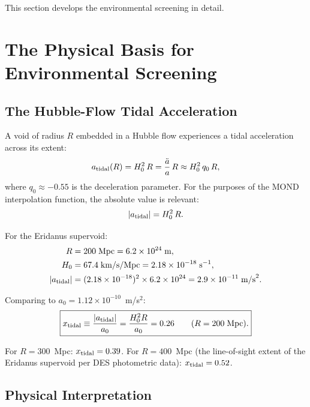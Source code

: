\documentclass[11pt,a4paper]{article}
\newcommand{\aM}{a_0}
\newcommand{\ee}[1]{\times 10^{#1}}
\begin{document}
This section develops the environmental screening in detail.


\section{The Physical Basis for Environmental Screening}
\label{sec:screening-physics}

\subsection{The Hubble-Flow Tidal Acceleration}

A void of radius $R$ embedded in a Hubble flow experiences a
tidal acceleration across its extent:
\begin{equation}
a_{\rm tidal}(R) = H_0^2\,R = \frac{\ddot{a}}{a}\,R
\approx H_0^2\,q_0\,R,
\label{eq:a-tidal}
\end{equation}
where $q_0 \approx -0.55$ is the deceleration parameter. For the
purposes of the MOND interpolation function, the absolute value
is relevant:
\begin{equation}
|a_{\rm tidal}| = H_0^2\,R.
\end{equation}

For the Eridanus supervoid:
\begin{align}
R &= 200\;\text{Mpc} = 6.2\ee{24}\;\text{m}, \\
H_0 &= 67.4\;\text{km/s/Mpc} = 2.18\ee{-18}\;\text{s}^{-1}, \\
|a_{\rm tidal}| &= (2.18\ee{-18})^2 \times 6.2\ee{24}
= 2.9\ee{-11}\;\text{m/s}^2.
\end{align}

Comparing to $\aM = 1.12\ee{-10}$~m/s$^2$:
\begin{equation}
\boxed{x_{\rm tidal} \equiv \frac{|a_{\rm tidal}|}{\aM}
= \frac{H_0^2 R}{\aM} = 0.26
\qquad (R = 200\;\text{Mpc}).}
\label{eq:x-tidal}
\end{equation}

For $R = 300$~Mpc: $x_{\rm tidal} = 0.39$. For $R = 400$~Mpc
(the line-of-sight extent of the Eridanus supervoid per DES
photometric data): $x_{\rm tidal} = 0.52$.

\subsection{Physical Interpretation}
\end{document}
